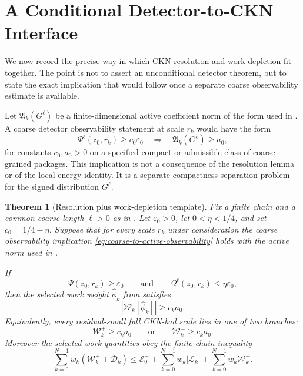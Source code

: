 \documentclass[10pt,a4paper]{amsart}
\numberwithin{equation}{section}
\newtheorem{theorem}{Theorem}[section]
\newcommand{\eps}{\varepsilon}
\newcommand{\W}{\mathcal W}
\newcommand{\D}{\mathcal D}
\newcommand{\Lk}{\mathcal L}
\newcommand{\Ek}{\mathcal E}
\newcommand{\Aact}{\mathfrak A}
\begin{document}
\section{A Conditional Detector-to-CKN Interface}\label{sec:conditional-interface}

We now record the precise way in which CKN resolution and work depletion fit together.  The point is not to assert an unconditional detector theorem, but to state the exact implication that would follow once a separate coarse observability estimate is available.

Let \(\Aact_k(G^\ell)\) be a finite-dimensional active coefficient norm of the form used in .  A coarse detector observability statement at scale \(r_k\) would have the form
\begin{equation}\label{eq:coarse-to-active-observability}
\Psi^\ell(z_0,r_k)\ge c_0\eps_0
\quad\Longrightarrow\quad
\Aact_k(G^\ell)\ge a_0,
\end{equation}
for constants \(c_0,a_0>0\) on a specified compact or admissible class of coarse-grained packages.  This implication is not a consequence of the resolution lemma or of the local energy identity.  It is a separate compactness-separation problem for the signed distribution \(G^\ell\).

\begin{theorem}[Resolution plus work-depletion template]\label{thm:resolution-work-template}
Fix a finite chain and a common coarse length \(\ell>0\) as in .  Let \(\eps_0>0\), let \(0<\eta<1/4\), and set \(c_0=1/4-\eta\).  Suppose that for every scale \(r_k\) under consideration the coarse observability implication \eqref{eq:coarse-to-active-observability} holds with the active norm used in .

If
\[
\Psi(z_0,r_k)\ge \eps_0
\qquad\text{and}\qquad
\Omega^\ell(z_0,r_k)\le \eta\eps_0,
\]
then the selected work weight \(\widehat\phi_k\) from  satisfies
\begin{equation}\label{eq:bad-scale-work-alternative}
|\W_k[\widehat\phi_k]|\ge c_k a_0.
\end{equation}
Equivalently, every residual-small full CKN-bad scale lies in one of two branches:
\[
\W_k^+\ge c_k a_0
\qquad\text{or}\qquad
\W_k^-\ge c_k a_0.
\]
Moreover the selected work quantities obey the finite-chain inequality
\begin{equation}\label{eq:template-chain-bound}
\sum_{k=0}^{N-1} w_k(\W_k^+ + \D_k)
\le
\Ek_0^-+
\sum_{k=0}^{N-1}w_k|\Lk_k|+
\sum_{k=0}^{N-1}w_k\W_k^-.
\end{equation}
\end{theorem}
\end{document}
